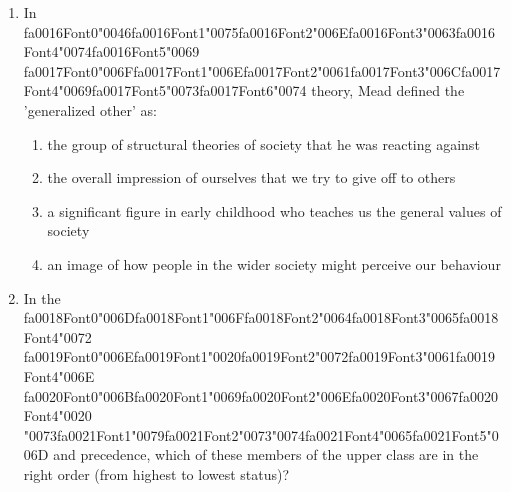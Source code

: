 \documentclass[12pt]{article}
\begin{document}
\begin{enumerate}[label=\arabic*.]
\begin{enumerate}[label=(\alph*)]
    \item an empire with a bureaucratic administration but no political centre
    \item an awareness of risks and dangers that affect the environment as a whole
    \item a unit with a division of labour that extends across ethnic and cultural groups
\end{enumerate}
\item In {\csname fa0016Font0\endcsname\char"0046}{\csname fa0016Font1\endcsname\char"0075}{\csname fa0016Font2\endcsname\char"006E}{\csname fa0016Font3\endcsname\char"0063}{\csname fa0016Font4\endcsname\char"0074}{\csname fa0016Font5\endcsname\char"0069} {\csname fa0017Font0\endcsname\char"006F}{\csname fa0017Font1\endcsname\char"006E}{\csname fa0017Font2\endcsname\char"0061}{\csname fa0017Font3\endcsname\char"006C}{\csname fa0017Font4\endcsname\char"0069}{\csname fa0017Font5\endcsname\char"0073}{\csname fa0017Font6\endcsname\char"0074} theory, Mead defined the 'generalized other' as:
\begin{enumerate}[label=(\alph*)]
    \item the group of structural theories of society that he was reacting against
    \item the overall impression of ourselves that we try to give off to others
    \item a significant figure in early childhood who teaches us the general values of society
    \item an image of how people in the wider society might perceive our behaviour
\end{enumerate}
\item In the {\csname fa0018Font0\endcsname\char"006D}{\csname fa0018Font1\endcsname\char"006F}{\csname fa0018Font2\endcsname\char"0064}{\csname fa0018Font3\endcsname\char"0065}{\csname fa0018Font4\endcsname\char"0072} {\csname fa0019Font0\endcsname\char"006E}{\csname fa0019Font1\endcsname\char"0020}{\csname fa0019Font2\endcsname\char"0072}{\csname fa0019Font3\endcsname\char"0061}{\csname fa0019Font4\endcsname\char"006E} {\csname fa0020Font0\endcsname\char"006B}{\csname fa0020Font1\endcsname\char"0069}{\csname fa0020Font2\endcsname\char"006E}{\csname fa0020Font3\endcsname\char"0067}{\csname fa0020Font4\endcsname\char"0020} {\char"0073}{\csname fa0021Font1\endcsname\char"0079}{\csname fa0021Font2\endcsname\char"0073}{\char"0074}{\csname fa0021Font4\endcsname\char"0065}{\csname fa0021Font5\endcsname\char"006D} and precedence, which of these members of the upper class are in the right order (from highest to lowest status)?

\end{enumerate}
\end{document}
